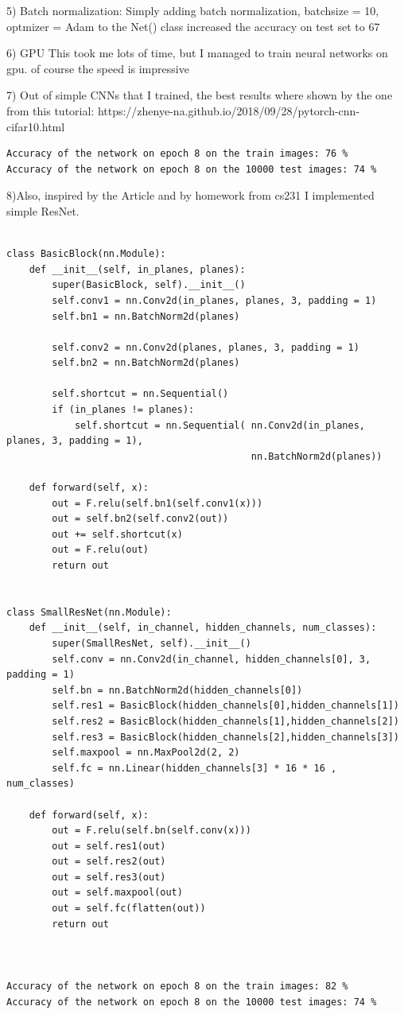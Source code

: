 \documentclass[11pt]{article}
\begin{document}
5) Batch normalization:
Simply adding batch normalization, batchsize = 10, optmizer = Adam to the Net() class increased the accuracy on test set to 67%

6) GPU
This took me lots of time, but I managed to train neural networks on gpu. of course the speed is impressive

7) Out of simple CNNs that I trained, the best results where shown by the one from this tutorial: 
https://zhenye-na.github.io/2018/09/28/pytorch-cnn-cifar10.html 

\begin{lstlisting}
Accuracy of the network on epoch 8 on the train images: 76 %
Accuracy of the network on epoch 8 on the 10000 test images: 74 %
\end{lstlisting}

8)Also, inspired by the Article and by homework from cs231 I implemented simple ResNet.
\begin{lstlisting}

class BasicBlock(nn.Module):
    def __init__(self, in_planes, planes):
        super(BasicBlock, self).__init__()
        self.conv1 = nn.Conv2d(in_planes, planes, 3, padding = 1)
        self.bn1 = nn.BatchNorm2d(planes)
        
        self.conv2 = nn.Conv2d(planes, planes, 3, padding = 1)
        self.bn2 = nn.BatchNorm2d(planes)
        
        self.shortcut = nn.Sequential()
        if (in_planes != planes):
            self.shortcut = nn.Sequential( nn.Conv2d(in_planes, planes, 3, padding = 1),
                                           nn.BatchNorm2d(planes))
            
    def forward(self, x):
        out = F.relu(self.bn1(self.conv1(x)))
        out = self.bn2(self.conv2(out))
        out += self.shortcut(x) 
        out = F.relu(out)
        return out     
            

class SmallResNet(nn.Module):
    def __init__(self, in_channel, hidden_channels, num_classes):
        super(SmallResNet, self).__init__()
        self.conv = nn.Conv2d(in_channel, hidden_channels[0], 3, padding = 1) 
        self.bn = nn.BatchNorm2d(hidden_channels[0])
        self.res1 = BasicBlock(hidden_channels[0],hidden_channels[1])
        self.res2 = BasicBlock(hidden_channels[1],hidden_channels[2])
        self.res3 = BasicBlock(hidden_channels[2],hidden_channels[3])
        self.maxpool = nn.MaxPool2d(2, 2) 
        self.fc = nn.Linear(hidden_channels[3] * 16 * 16 , num_classes) 

    def forward(self, x):
        out = F.relu(self.bn(self.conv(x)))
        out = self.res1(out)
        out = self.res2(out)
        out = self.res3(out)
        out = self.maxpool(out)
        out = self.fc(flatten(out))
        return out
        
        
        
Accuracy of the network on epoch 8 on the train images: 82 %
Accuracy of the network on epoch 8 on the 10000 test images: 74 %
\end{lstlisting}   
\end{document}
